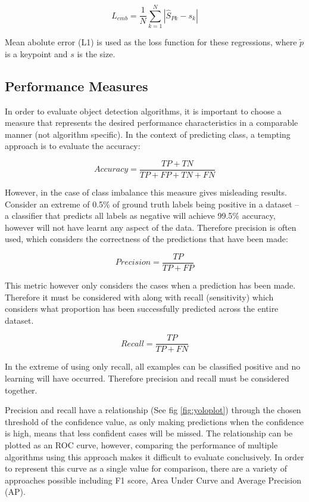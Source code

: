 \documentclass[a4paper,twoside,12pt]{report}
\begin{document}
\begin{equation}
L_{emb} =  \frac{1}{N} \sum_{k=1}^{N} |\hat{S}_{Pk}-s_k|
\end{equation}

Mean abolute error (L1) is used as the loss function for these regressions, where $\tilde{p}$ is a keypoint and $s$ is the size.

\subsection{Performance Measures}

In order to evaluate object detection algorithms, it is important to choose a measure that represents the desired performance characteristics in a comparable manner (not algorithm specific). In the context of predicting class, a tempting approach is to evaluate the accuracy:

\begin{equation}
Accuracy = \frac{TP + TN}{TP + FP + TN + FN}
\end{equation}

However, in the case of class imbalance this measure gives misleading results. Consider an extreme of 0.5\% of ground truth labels being positive in a dataset -- a classifier that predicts all labels as negative will achieve 99.5\% accuracy, however will not have learnt any aspect of the data. Therefore precision is often used, which considers the correctness of the predictions that have been made:

\begin{equation}
Precision = \frac{TP}{TP + FP}
\end{equation}

This metric however only considers the cases when a prediction has been made. Therefore it must be considered with along with recall (sensitivity) which considers what proportion has been successfully predicted across the entire dataset.

\begin{equation}
Recall = \frac{TP}{TP + FN}
\end{equation}

In the extreme of using only recall, all examples can be classified positive and no learning will have occurred. Therefore precision and recall must be considered together.

Precision and recall have a relationship (See fig \ref{fig:yoloplot}) through the chosen threshold of the confidence value, as only making predictions when the confidence is high, means that less confident cases will be missed. The relationship can be plotted as an ROC curve, however, comparing the performance of multiple algorithms using this approach makes it difficult to evaluate conclusively. In order to represent this curve as a single value for comparison, there are a variety of approaches possible including F1 score, Area Under Curve and Average Precision (AP).
\end{document}
